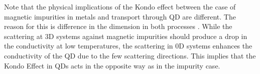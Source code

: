 Note that the physical implications of the Kondo effect  between the case of magnetic impurities in metals and transport through QD are different. The reason for this is difference in the dimension in both processes . While the scattering at 3D systems against magnetic impurities should produce a drop in the conductivity at low temperatures, the scattering in 0D systems enhances the conductivity of the QD due to the few scattering directions. This implies that the Kondo Effect in QDs acts in the opposite way as in the impurity case. 




















